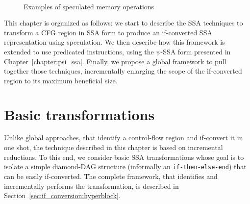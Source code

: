 \begin{figure}[h]
\hfill
{}\\
\hfill
{}
\caption{Examples of speculated memory operations}
\label{fig:spec}
\end{figure}




This chapter is organized as follows: 
we start to describe the SSA techniques to transform a CFG region in SSA form to produce an if-converted SSA representation using speculation. 
We then describe how this framework is extended to use predicated instructions, using the $\psi$-SSA form presented in Chapter~\ref{chapter:psi_ssa}. 
Finally, we propose a global framework to pull together those techniques, incrementally enlarging the scope of the if-converted region to its maximum beneficial size.

\section{Basic transformations}
\label{sec:basic}

Unlike global approaches, that identify a control-flow region and if-convert it in one shot, the technique described in this chapter is based on incremental reductions. 
To this end, we consider basic SSA transformations whose goal is to isolate a simple diamond-DAG structure (informally an \texttt{if-then-else-end}) that can be easily if-converted. 
The complete framework, that identifies and incrementally performs the transformation, is described in Section~\ref{sec:if_conversion:hyperblock}.

